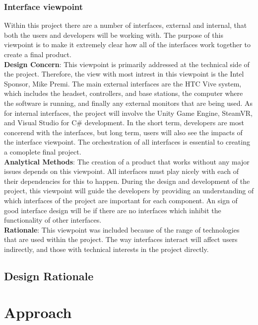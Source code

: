 \documentclass[10pt,journal,compsoc,onecolumn, draftclsnofoot]{IEEEtran}
\begin{document}
\subsubsection{Interface viewpoint}
Within this project there are a number of interfaces, external and internal, that both the users and developers will be working with.
The purpose of this viewpoint is to make it extremely clear how all of the interfaces work together to create a final product. \\

\hangindent=0.5cm \textbf{Design Concern}: This viewpoint is primarily addressed at the technical side of the project.
Therefore, the view with most intrest in this viewpoint is the Intel Sponsor, Mike Premi.
The main external interfaces are the HTC Vive system, which includes the headset, controllers, and base stations, the computer where the software is running, and finally any external monitors that are being used.
As for internal interfaces, the project will involve the Unity Game Engine, SteamVR, and Visual Studio for C\# development.
In the short term, developers are most concerend with the interfaces, but long term, users will also see the impacts of the interface viewpoint.
The orchestration of all interfaces is essential to creating a comoplete final project. \\
\hangindent=0.5cm \textbf{Analytical Methods}: The creation of a product that works without any major issues depends on this viewpoint.
All interfaces must play nicely with each of their dependencies for this to happen.
During the design and development of the project, this viewpoint will guide the developers by providing an understanding of which interfaces of the project are important for each component.
An sign of good interface design will be if there are no interfaces which inhibit the functionality of other interfaces.\\
\hangindent=0.5cm \textbf{Rationale}: This viewpoint was included because of the range of technologies that are used within the project.
The way interfaces interact will affect users indirectly, and those with technical interests in the project directly. \\


\subsection{Design Rationale}



\section{Approach}
\end{document}
